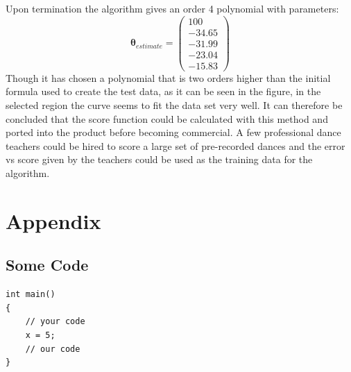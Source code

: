 \documentclass[10pt,a4paper]{article}
\begin{document}
\noindent 
Upon termination the algorithm gives an order 4 polynomial with parameters:
\begin{equation}
\boldsymbol \theta_{estimate} = 
\begin{pmatrix}
100\\
-34.65\\
-31.99\\
-23.04\\
-15.83
\end{pmatrix}
\end{equation}
\noindent 
Though it has chosen a polynomial that is two orders higher than the initial formula used to create the test data, as it can be seen in the figure, in the selected region the curve seems to fit the data set very well. It can therefore be concluded that the score function could be calculated with this method and ported into the product before becoming commercial. A few professional dance teachers could be hired to score a large set of pre-recorded dances and the error vs score given by the teachers could be used as the training data for the algorithm. 



\clearpage
\section*{Appendix}
\subsection*{Some Code}
\begin{lstlisting}
int main()
{
	// your code
	x = 5;
	// our code
}

\end{lstlisting}
\end{document}
